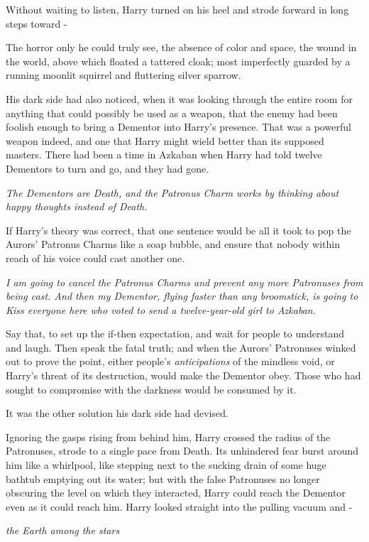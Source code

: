 Without waiting to listen, Harry turned on his heel and strode forward
in long steps toward -

The horror only he could truly see, the absence of color and space, the
wound in the world, above which floated a tattered cloak; most
imperfectly guarded by a running moonlit squirrel and fluttering silver
sparrow.

His dark side had also noticed, when it was looking through the entire
room for anything that could possibly be used as a weapon, that the
enemy had been foolish enough to bring a Dementor into Harry's presence.
That was a powerful weapon indeed, and one that Harry might wield better
than its supposed masters. There had been a time in Azkaban when Harry
had told twelve Dementors to turn and go, and they had gone.

\emph{The Dementors are Death, and the Patronus Charm works by thinking
about happy thoughts instead of Death.}

If Harry's theory was correct, that one sentence would be all it took to
pop the Aurors' Patronus Charms like a soap bubble, and ensure that
nobody within reach of his voice could cast another one.

\emph{I am going to cancel the Patronus Charms and prevent any more
Patronuses from being cast. And then my Dementor, flying faster than any
broomstick, is going to Kiss everyone here who voted to send a
twelve-year-old girl to Azkaban.}

Say that, to set up the if-then expectation, and wait for people to
understand and laugh. Then speak the fatal truth; and when the Aurors'
Patronuses winked out to prove the point, either people's
\emph{anticipations} of the mindless void, or Harry's threat of its
destruction, would make the Dementor obey. Those who had sought to
compromise with the darkness would be consumed by it.

It was the other solution his dark side had devised.

Ignoring the gasps rising from behind him, Harry crossed the radius of
the Patronuses, strode to a single pace from Death. Its unhindered fear
burst around him like a whirlpool, like stepping next to the sucking
drain of some huge bathtub emptying out its water; but with the false
Patronuses no longer obscuring the level on which they interacted, Harry
could reach the Dementor even as it could reach him. Harry looked
straight into the pulling vacuum and -

\emph{the Earth among the stars}

